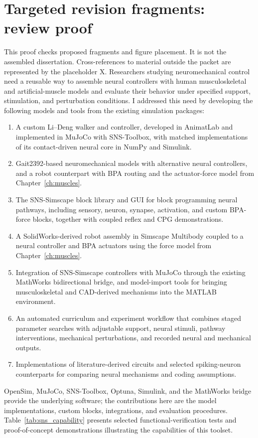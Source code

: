 \documentclass[11pt]{report}
\begin{document}
\chapter*{Targeted revision fragments: review proof}
This proof checks proposed fragments and figure placement. It is not the assembled dissertation. Cross-references to material outside the packet are represented by the placeholder X.
Researchers studying neuromechanical control need a reusable way to assemble neural controllers with human musculoskeletal and artificial-muscle models and evaluate their behavior under specified support, stimulation, and perturbation conditions. I addressed this need by developing the following models and tools from the existing simulation packages:
\begin{enumerate}
    \item A custom Li--Deng walker and controller, developed in AnimatLab and implemented in MuJoCo with SNS-Toolbox, with matched implementations of its contact-driven neural core in NumPy and Simulink.
    \item Gait2392-based neuromechanical models with alternative neural controllers, and a robot counterpart with BPA routing and the actuator-force model from Chapter~\ref{ch:muscles}.
    \item The SNS-Simscape block library and GUI for block programming neural pathways, including sensory, neuron, synapse, activation, and custom BPA-force blocks, together with coupled reflex and CPG demonstrations.
    \item A SolidWorks-derived robot assembly in Simscape Multibody coupled to a neural controller and BPA actuators using the force model from Chapter~\ref{ch:muscles}.
    \item Integration of SNS-Simscape controllers with MuJoCo through the existing MathWorks bidirectional bridge, and model-import tools for bringing musculoskeletal and CAD-derived mechanisms into the MATLAB environment.
    \item An automated curriculum and experiment workflow that combines staged parameter searches with adjustable support, neural stimuli, pathway interventions, mechanical perturbations, and recorded neural and mechanical outputs.
    \item Implementations of literature-derived circuits and selected spiking-neuron counterparts for comparing neural mechanisms and coding assumptions.
\end{enumerate}
OpenSim, MuJoCo, SNS-Toolbox, Optuna, Simulink, and the MathWorks bridge provide the underlying software; the contributions here are the model implementations, custom blocks, integrations, and evaluation procedures. Table~\ref{tab:sns_capability} presents selected functional-verification tests and proof-of-concept demonstrations illustrating the capabilities of this toolset.
\end{document}
